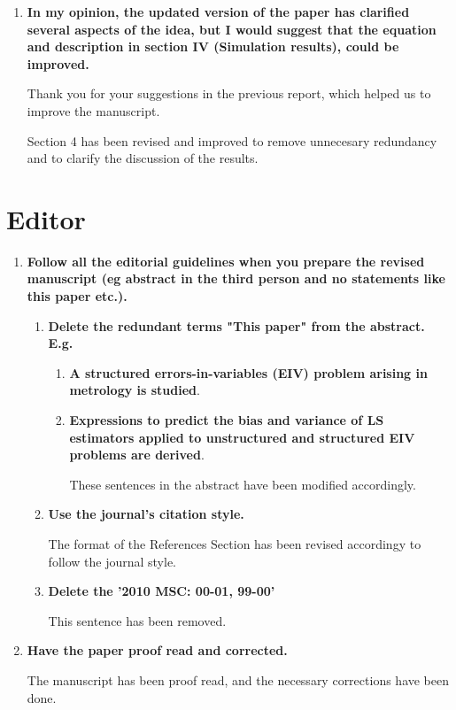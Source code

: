 \documentclass[11pt]{article}
\begin{document}
\begin{enumerate}

\item  \textbf{In my opinion, the updated version of the paper has clarified several aspects of the idea, but I would suggest that the equation and description in section IV (Simulation results), could be improved.}

Thank you for your suggestions in the previous report, which helped us to improve the manuscript.

Section 4 has been revised and improved to remove unnecesary redundancy and to clarify the discussion of the results.

\end{enumerate}


\section*{Editor}

\begin{enumerate}

\item \textbf{Follow all the editorial guidelines when you prepare the revised manuscript 
(eg abstract in the third person and no statements like this paper etc.).}

\begin{enumerate}

\item \textbf{Delete the redundant terms "This paper" from the abstract.  E.g.}

\begin{enumerate}

\item \textbf{A structured errors-in-variables (EIV) problem arising in metrology is studied}.

\item \textbf{Expressions to predict the bias and variance of LS estimators applied to unstructured and structured EIV problems are derived}.

These sentences in the abstract have been modified accordingly.

\end{enumerate}

\item \textbf{Use the journal's citation style.}

The format of the References Section has been revised accordingy to follow the journal style.

\item \textbf{Delete the '2010 MSC: 00-01, 99-00'}

This sentence has been removed.

\end{enumerate}

\item  \textbf{Have the paper proof read and corrected.}

The manuscript has been proof read, and the necessary corrections have been done.

\end{enumerate}
\end{document}
